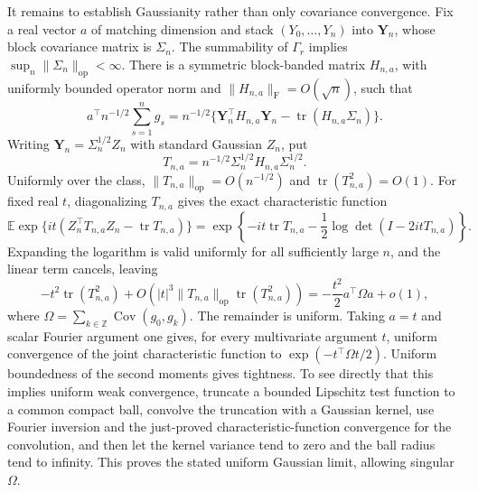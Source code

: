 It remains to establish Gaussianity rather than only covariance convergence.  Fix a real vector \(a\) of matching dimension and stack \((Y_0,\ldots,Y_n)\) into \(\mathbf Y_n\), whose block covariance matrix is \(\Sigma_n\).  The summability of \(\Gamma_r\) implies \(\sup_n\|\Sigma_n\|_{\mathrm{op}}<\infty\).  There is a symmetric block-banded matrix \(H_{n,a}\), with uniformly bounded operator norm and \(\|H_{n,a}\|_{\mathrm F}=O(\sqrt n)\), such that
\[
 a^\top n^{-1/2}\sum_{s=1}^{n}g_s
 =n^{-1/2}\{\mathbf Y_n^\top H_{n,a}\mathbf Y_n-\operatorname{tr}(H_{n,a}\Sigma_n)\}.
\]
Writing \(\mathbf Y_n=\Sigma_n^{1/2}Z_n\) with standard Gaussian \(Z_n\), put
\[
 T_{n,a}=n^{-1/2}\Sigma_n^{1/2}H_{n,a}\Sigma_n^{1/2}.
\]
Uniformly over the class, \(\|T_{n,a}\|_{\mathrm{op}}=O(n^{-1/2})\) and \(\operatorname{tr}(T_{n,a}^2)=O(1)\).  For fixed real \(t\), diagonalizing \(T_{n,a}\) gives the exact characteristic function
\[
 \mathbb E\exp\{it(Z_n^\top T_{n,a}Z_n-\operatorname{tr}T_{n,a})\}
 =\exp\left\{-it\operatorname{tr}T_{n,a}-\frac12\log\det(I-2itT_{n,a})\right\}.
\]
Expanding the logarithm is valid uniformly for all sufficiently large \(n\), and the linear term cancels, leaving
\[
 -t^2\operatorname{tr}(T_{n,a}^2)+O\!\left(|t|^3\|T_{n,a}\|_{\mathrm{op}}\operatorname{tr}(T_{n,a}^2)\right)
 =-\frac{t^2}{2}a^\top\Omega a+o(1),
\]
where \(\Omega=\sum_{k\in\mathbb Z}\operatorname{Cov}(g_0,g_k)\).  The remainder is uniform.  Taking \(a=t\) and scalar Fourier argument one gives, for every multivariate argument \(t\), uniform convergence of the joint characteristic function to \(\exp(-t^\top\Omega t/2)\).  Uniform boundedness of the second moments gives tightness.  To see directly that this implies uniform weak convergence, truncate a bounded Lipschitz test function to a common compact ball, convolve the truncation with a Gaussian kernel, use Fourier inversion and the just-proved characteristic-function convergence for the convolution, and then let the kernel variance tend to zero and the ball radius tend to infinity.  This proves the stated uniform Gaussian limit, allowing singular \(\Omega\).

